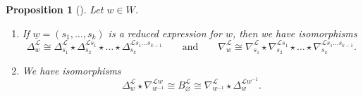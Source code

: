 \documentclass{amsart}
\newcommand{\scrL}{\mathcal{L}}
\newcommand{\uw}{\underline{w}}
\renewcommand{\emptyset}{\varnothing}
\newtheorem{proposition}[subsubsection]{Proposition}
\theoremstyle{definition}
\numberwithin{equation}{subsection}
\begin{document}
\begin{proposition}[{\cite[Proposition 6.11]{ARV}}]\label{prop:mixed_conv_rules}
    Let $w \in W$.
    \begin{enumerate}
        \item If $\uw = (s_1, \ldots, s_k)$ is a reduced expression for $w$, then we have isomorphisms
        \[\Delta_w^{\scrL} \cong \Delta_{s_1}^{\scrL} \star \Delta_{s_2}^{\scrL s_1} \star \ldots \star \Delta_{s_k}^{\scrL s_1 \ldots s_{k-1}} \qquad\text{and}\qquad \nabla_w^{\scrL} \cong \nabla_{s_1}^{\scrL} \star \nabla_{s_2}^{\scrL s_1} \star \ldots \star \nabla_{s_k}^{\scrL s_1 \ldots s_{k-1}}.\]
        \item We have isomorphisms
            \[\Delta_w^{\scrL} \star \nabla_{w^{-1}}^{\scrL w} \cong B_{\emptyset}^{\scrL} \cong \nabla_{w^{-1}}^{\scrL} \star \Delta_w^{\scrL w^{-1}}.\]
    \end{enumerate}
\end{proposition}
\end{document}
